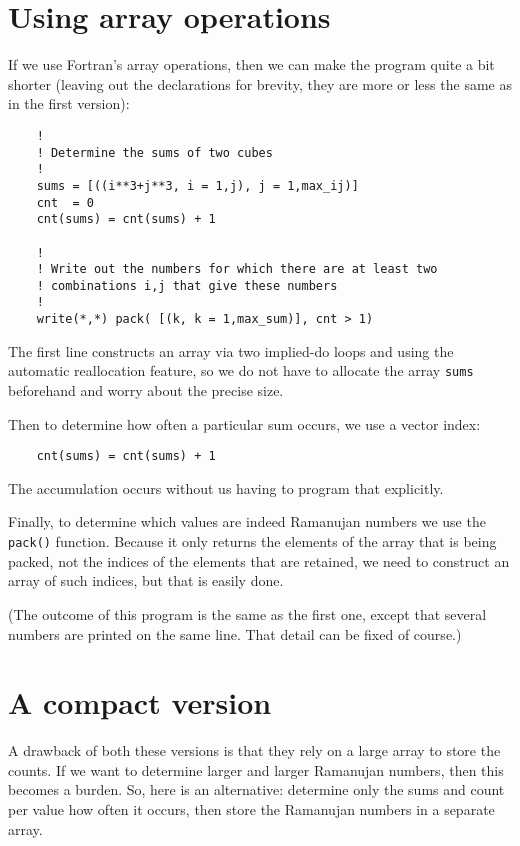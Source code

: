 \documentclass[onecolumn]{article}
\begin{document}
\section*{Using array operations}
If we use Fortran's array operations, then we can make the program quite a bit shorter (leaving out the declarations for brevity, they are more
or less the same as in the first version):

\begin{verbatim}
    !
    ! Determine the sums of two cubes
    !
    sums = [((i**3+j**3, i = 1,j), j = 1,max_ij)]
    cnt  = 0
    cnt(sums) = cnt(sums) + 1

    !
    ! Write out the numbers for which there are at least two
    ! combinations i,j that give these numbers
    !
    write(*,*) pack( [(k, k = 1,max_sum)], cnt > 1)
\end{verbatim}

The first line constructs an array via two implied-do loops and using the automatic reallocation feature, so we do not have to allocate
the array \verb+sums+ beforehand and worry about the precise size.

Then to determine how often a particular sum occurs, we use a vector index:

\begin{verbatim}
    cnt(sums) = cnt(sums) + 1
\end{verbatim}

The accumulation occurs without us having to program that explicitly.

Finally, to determine which values are indeed Ramanujan numbers we use the \verb+pack()+ function. Because it only returns the elements
of the array that is being packed, not the indices of the elements that are retained, we need to construct an array of such indices, but
that is easily done.

(The outcome of this program is the same as the first one, except that several numbers are printed on the same line. That detail
can be fixed of course.)


\section*{A compact version}

A drawback of both these versions is that they rely on a large array to store the counts. If we want to determine larger and larger
Ramanujan numbers, then this becomes a burden. So, here is an alternative: determine only the sums and count per value how often
it occurs, then store the Ramanujan numbers in a separate array.
\end{document}
